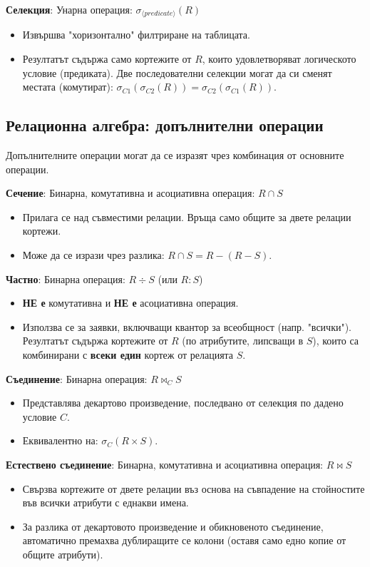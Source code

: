 \documentclass{article}
\renewcommand{\\}{\newline}
\begin{document}
\textbf{Селекция}: Унарна операция: $\sigma_{\langle predicate\rangle}(R)$ 
\begin{itemize}
    \item Извършва "хоризонтално" филтриране на таблицата.
    \item Резултатът съдържа само кортежите от $R$, които удовлетворяват логическото условие (предиката). Две последователни селекции могат да си сменят местата (комутират): $\sigma_{C1}(\sigma_{C2}(R)) = \sigma_{C2}(\sigma_{C1}(R))$.
\end{itemize}

\subsection{Релационна алгебра: допълнителни операции}

Допълнителните операции могат да се изразят чрез комбинация от основните операции.

\textbf{Сечение}: Бинарна, комутативна и асоциативна операция: $R \cap S$ 
\begin{itemize}
    \item Прилага се над съвместими релации. Връща само общите за двете релации кортежи.
    \item Може да се изрази чрез разлика: $R \cap S = R - (R - S)$.
\end{itemize}

\textbf{Частно}: Бинарна операция: $R \div S$ (или $R : S$)
\begin{itemize}
    \item \textbf{НЕ е} комутативна и \textbf{НЕ е} асоциативна операция.
    \item Използва се за заявки, включващи квантор за всеобщност (напр. "всички"). Резултатът съдържа кортежите от $R$ (по атрибутите, липсващи в $S$), които са комбинирани с \textbf{всеки един} кортеж от релацията $S$.
\end{itemize}

\textbf{Съединение}: Бинарна операция: $R \bowtie_{C} S$ 
\begin{itemize}
    \item Представлява декартово произведение, последвано от селекция по дадено условие $C$.
    \item Еквивалентно на: $\sigma_{C}(R \times S)$.
\end{itemize}

\textbf{Естествено съединение}: Бинарна, комутативна и асоциативна операция: $R \bowtie S$ 
\begin{itemize}
    \item Свързва кортежите от двете релации въз основа на съвпадение на стойностите във всички атрибути с еднакви имена.
    \item За разлика от декартовото произведение и обикновеното съединение, автоматично премахва дублиращите се колони (оставя само едно копие от общите атрибути).
\end{itemize}
\newpage
\end{document}
